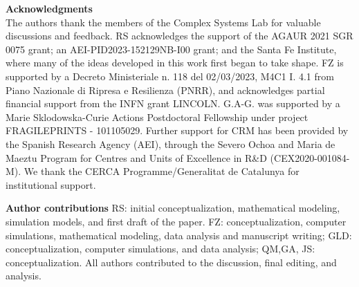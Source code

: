 \documentclass[10pt, aps, rmp,  twocolumn, superscriptaddress, floatfix, showkeys]{revtex4-2}
\newcommand{\detailtexcount}[1]{%
  \immediate\write18{texcount -v -merge -q #1.tex > #1.wcdet}%
}
\begin{document}
\vspace{0.2 cm}

{\bf Acknowledgments}
\vspace{0.2 cm}
\\
The authors thank the members of the Complex Systems Lab for valuable discussions and feedback. RS acknowledges the support of the AGAUR 2021 SGR 0075 grant; an AEI-PID2023-152129NB-I00 grant; and the Santa Fe Institute, where many of the ideas developed in this work first began to take shape. FZ is supported by a Decreto Ministeriale n. 118 del 02/03/2023, M4C1 I. 4.1 from Piano Nazionale di Ripresa e Resilienza (PNRR), and acknowledges partial financial support from the INFN grant LINCOLN. G.A-G. was supported by a Marie Sklodowska-Curie Actions Postdoctoral Fellowship under project FRAGILEPRINTS - 101105029. Further support for CRM has been provided by the Spanish Research Agency (AEI), through the Severo Ochoa and Maria de Maeztu Program for Centres and Units of Excellence in R\&D (CEX2020-001084-M). We thank the CERCA Programme/Generalitat de Catalunya for institutional
support.
\vspace{0.2 cm}


{\bf Author contributions} RS: initial conceptualization, mathematical modeling, simulation models, and first draft of the paper. FZ: conceptualization, computer simulations, mathematical modeling, data analysis and manuscript writing; GLD: conceptualization, computer simulations, and data analysis; QM,GA, JS: conceptualization. All authors contributed to the discussion, final editing, and analysis. 




\vspace{0.2 cm}


\renewcommand{\bibsection}{\section*{References}}


\end{document}
